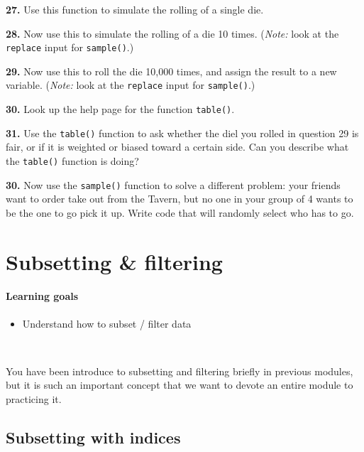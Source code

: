 \documentclass[
]{book}
\providecommand{\tightlist}{%
  \setlength{\itemsep}{0pt}\setlength{\parskip}{0pt}}
\begin{document}
\textbf{27.} Use this function to simulate the rolling of a single die.

\textbf{28.} Now use this to simulate the rolling of a die 10 times. (\emph{Note:} look at the \texttt{replace} input for \texttt{sample()}.)

\textbf{29.} Now use this to roll the die 10,000 times, and assign the result to a new variable. (\emph{Note:} look at the \texttt{replace} input for \texttt{sample()}.)

\textbf{30.} Look up the help page for the function \texttt{table()}.

\textbf{31.} Use the \texttt{table()} function to ask whether the diel you rolled in question 29 is fair, or if it is weighted or biased toward a certain side. Can you describe what the \texttt{table()} function is doing?

\textbf{30.} Now use the \texttt{sample()} function to solve a different problem: your friends want to order take out from the Tavern, but no one in your group of 4 wants to be the one to go pick it up. Write code that will randomly select who has to go.

\hypertarget{subsetting-filtering}{%
\chapter{Subsetting \& filtering}\label{subsetting-filtering}}

\hypertarget{learning-goals-5}{%
\subsubsection*{Learning goals}\label{learning-goals-5}}

\begin{itemize}
\tightlist
\item
  Understand how to subset / filter data
\end{itemize}

~

You have been introduce to subsetting and filtering briefly in previous modules, but it is such an important concept that we want to devote an entire module to practicing it.

\hypertarget{subsetting-with-indices}{%
\section*{Subsetting with indices}\label{subsetting-with-indices}}
\end{document}
